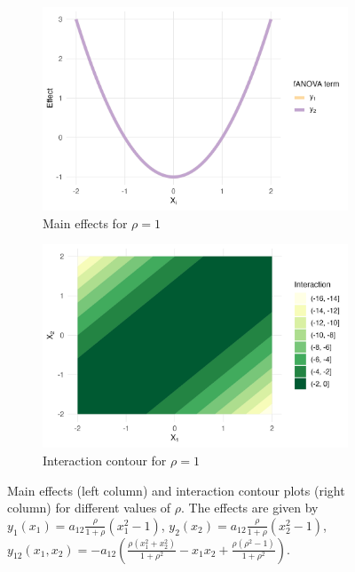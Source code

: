 \begin{figure}[htpb]
    \vspace{0.5em}
    \begin{subfigure}[t]{0.49\textwidth}
        \centering
        \includegraphics[width=\textwidth]{images/experiment_section/interaction_a1p00_a2p00_a11p00_a22p00_a12p20_rhop10_main.png}
        \caption{Main effects for $\rho = 1$}
    \end{subfigure}%
    \hfill
    \begin{subfigure}[t]{0.49\textwidth}
        \centering
        \includegraphics[width=\textwidth]{images/experiment_section/interaction_a1p00_a2p00_a11p00_a22p00_a12p20_rhop10_interaction.png}
        \caption{Interaction contour for $\rho = 1$}
    \end{subfigure}

    \caption{Main effects (left column) and interaction contour plots (right column) for different values of $\rho$. The effects are given by $y_{1}(x_1) = a_{12} \frac{\rho}{1+ \rho} (x_1^2 - 1)$,
    $y_{2}(x_2) = a_{12} \frac{\rho}{1+ \rho} (x_2^2 - 1)$,
    $y_{12}(x_1,x_2) = -a_{12}\!\left(\frac{\rho(x_1^2+x_2^2)}{1+\rho^2} - x_1 x_2 + \frac{\rho(\rho^2-1)}{1+\rho^2}\right)$.}
    \label{fig:interaction_combined}
\end{figure}

